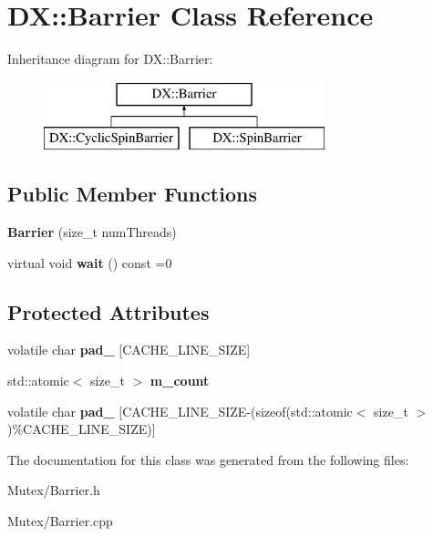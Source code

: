 \hypertarget{class_d_x_1_1_barrier}{\section{D\-X\-:\-:Barrier Class Reference}
\label{class_d_x_1_1_barrier}
}
Inheritance diagram for D\-X\-:\-:Barrier\-:\begin{figure}[H]
\begin{center}
\leavevmode
\includegraphics[height=2.000000cm]{class_d_x_1_1_barrier}
\end{center}
\end{figure}
\subsection*{Public Member Functions}
\begin{DoxyCompactItemize}
\item 
\hypertarget{class_d_x_1_1_barrier_ae7a881ba86bd4f16a25600f00457e710}{{\bfseries Barrier} (size\-\_\-t num\-Threads)}\label{class_d_x_1_1_barrier_ae7a881ba86bd4f16a25600f00457e710}

\item 
\hypertarget{class_d_x_1_1_barrier_a34b9c56a632e7ace41532794ff98694d}{virtual void {\bfseries wait} () const =0}\label{class_d_x_1_1_barrier_a34b9c56a632e7ace41532794ff98694d}

\end{DoxyCompactItemize}
\subsection*{Protected Attributes}
\begin{DoxyCompactItemize}
\item 
\hypertarget{class_d_x_1_1_barrier_a39956c1715d3c86fe73861b2fee5065d}{volatile char {\bfseries pad\-\_} \mbox{[}C\-A\-C\-H\-E\-\_\-\-L\-I\-N\-E\-\_\-\-S\-I\-Z\-E\mbox{]}}\label{class_d_x_1_1_barrier_a39956c1715d3c86fe73861b2fee5065d}

\item 
\hypertarget{class_d_x_1_1_barrier_ad9ffd4f0c093bfa7018fd836e4b7d681}{std\-::atomic$<$ size\-\_\-t $>$ {\bfseries m\-\_\-count}}\label{class_d_x_1_1_barrier_ad9ffd4f0c093bfa7018fd836e4b7d681}

\item 
\hypertarget{class_d_x_1_1_barrier_afd62281a71cce98c88af7430bc6442a7}{volatile char {\bfseries pad\-\_} \mbox{[}C\-A\-C\-H\-E\-\_\-\-L\-I\-N\-E\-\_\-\-S\-I\-Z\-E-\/(sizeof(std\-::atomic$<$ size\-\_\-t $>$)\%C\-A\-C\-H\-E\-\_\-\-L\-I\-N\-E\-\_\-\-S\-I\-Z\-E)\mbox{]}}\label{class_d_x_1_1_barrier_afd62281a71cce98c88af7430bc6442a7}

\end{DoxyCompactItemize}


The documentation for this class was generated from the following files\-:\begin{DoxyCompactItemize}
\item 
Mutex/Barrier.\-h\item 
Mutex/Barrier.\-cpp\end{DoxyCompactItemize}
